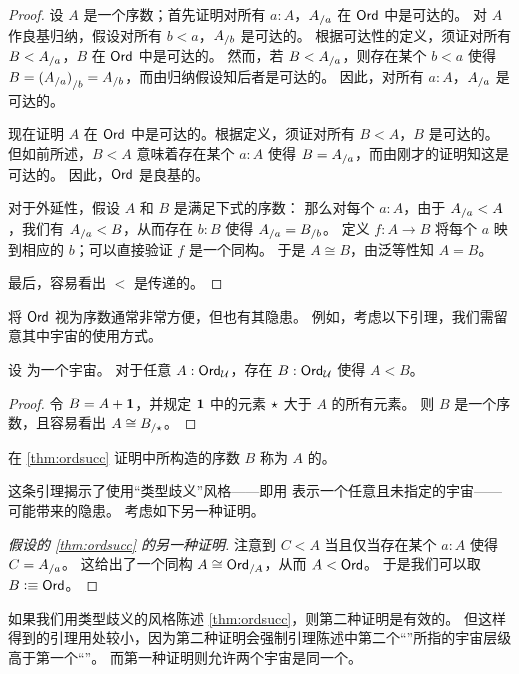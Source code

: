 \begin{proof}
  设 $A$ 是一个序数；首先证明对所有 $a:A$，${A}_{/a}$ 在 $\mathsf{Ord}$ 中是可达的。
  对 $A$ 作良基归纳，假设对所有 $b<a$，${A}_{/b}$ 是可达的。
  根据可达性的定义，须证对所有 $B<{A}_{/a}$，$B$ 在 $\mathsf{Ord}$ 中是可达的。
  然而，若 $B<{A}_{/a}$，则存在某个 $b<a$ 使得 $B = {({A}_{/a})}_{/b} = {A}_{/b}$，而由归纳假设知后者是可达的。
  因此，对所有 $a:A$，${A}_{/a}$ 是可达的。

  现在证明 $A$ 在 $\mathsf{Ord}$ 中是可达的。根据定义，须证对所有 $B<A$，$B$ 是可达的。
  但如前所述，$B<A$ 意味着存在某个 $a:A$ 使得 $B={A}_{/a}$，而由刚才的证明知这是可达的。
  因此，$\mathsf{Ord}$ 是良基的。

  对于外延性，假设 $A$ 和 $B$ 是满足下式的序数：
  那么对每个 $a:A$，由于 ${A}_{/a}<A$，我们有 ${A}_{/a}<B$，从而存在 $b:B$ 使得 ${A}_{/a} = {B}_{/b}$。
  定义 $f:A\to B$ 将每个 $a$ 映到相应的 $b$；可以直接验证 $f$ 是一个同构。
  于是 $A\cong B$，由泛等性知 $A=B$。

  最后，容易看出 $<$ 是传递的。
\end{proof}

将 $\mathsf{Ord}$ 视为序数通常非常方便，但也有其隐患。
例如，考虑以下引理，我们需留意其中宇宙的使用方式。

\begin{lem}\label{thm:ordsucc}
  设 \bbU 为一个宇宙。
  对于任意 $A:\mathsf{Ord}_{\mathcal{U}}$，存在 $B:\mathsf{Ord}_{\mathcal{U}}$ 使得 $A<B$。
\end{lem}

\begin{proof}
  令 $B=A+\mathbf{1}$，并规定 $\mathbf{1}$ 中的元素 $\star$ 大于 $A$ 的所有元素。
  则 $B$ 是一个序数，且容易看出 $A\cong {B}_{/\star}$。
\end{proof}

在 \cref{thm:ordsucc} 证明中所构造的序数 $B$ 称为 $A$ 的。

这条引理揭示了使用``类型歧义''风格——即用 \UU 表示一个任意且未指定的宇宙——可能带来的隐患。
考虑如下另一种证明。

\begin{proof}[假设的 \cref{thm:ordsucc} 的另一种证明]
  注意到 $C<A$ 当且仅当存在某个 $a:A$ 使得 $C={A}_{/a}$。
  这给出了一个同构 $A \cong {\ensuremath{\mathsf{Ord}}}_{/A}$，从而 $A<\mathsf{Ord}$。
  于是我们可以取 $B\vcentcolon\equiv\mathsf{Ord}$。
\end{proof}

如果我们用类型歧义的风格陈述 \cref{thm:ordsucc}，则第二种证明是有效的。
但这样得到的引理用处较小，因为第二种证明会强制引理陈述中第二个``\ord''所指的宇宙层级高于第一个``\ord''。
而第一种证明则允许两个宇宙是同一个。

